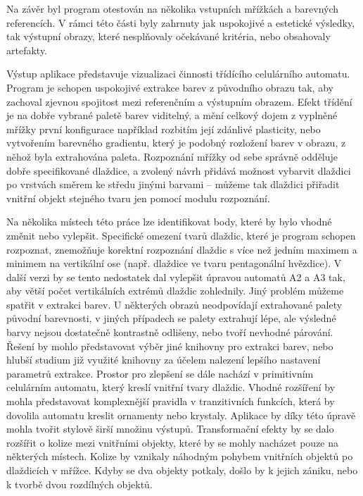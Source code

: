 Na závěr byl program otestován na několika vstupních mřížkách a barevných referencích. V rámci této části byly zahrnuty jak uspokojivé a estetické výsledky, tak výstupní obrazy, které nesplňovaly očekávané kritéria, nebo obsahovaly artefakty.

Výstup aplikace představuje vizualizaci činnosti třídícího celulárního automatu. Program je schopen uspokojivé extrakce barev z původního obrazu tak, aby zachoval zjevnou spojitost mezi referenčním a výstupním obrazem. Efekt třídění je na dobře vybrané paletě barev viditelný, a mění celkový dojem z vyplněné mřížky první konfigurace například rozbitím její zdánlivé plasticity, nebo vytvořením barevného gradientu, který je podobný rozložení barev v obrazu, z něhož byla extrahována paleta. Rozpoznání mřížky od sebe správně odděluje dobře specifikované dlaždice, a zvolený návrh přidává možnost vybarvit dlaždici po vrstvách směrem ke středu jinými barvami -- můžeme tak dlaždici přiřadit vnitřní objekt stejného tvaru jen pomocí modulu rozpoznání. 

Na několika místech této práce lze identifikovat body, které by bylo vhodné změnit nebo vylepšit. Specifické omezení tvarů dlaždic, které je program schopen rozpoznat, znemožňuje korektní rozpoznání dlaždic s více než jedním maximem a minimem na vertikální ose (např. dlaždice ve tvaru pentagonální hvězdice). V další verzi by se tento nedostatek dal vylepšit úpravou automatů A2 a A3 tak, aby větší počet vertikálních extrémů dlaždic zohlednily. Jiný problém můžeme spatřit v extrakci barev. U některých obrazů neodpovídají extrahované palety původní barevnosti, v jiných případech se palety extrahují lépe, ale výsledné barvy nejsou dostatečně kontrastně odlišeny, nebo tvoří nevhodné párování. Řešení by mohlo představovat výběr jiné knihovny pro extrakci barev, nebo hlubší studium již využité knihovny za účelem nalezení lepšího nastavení parametrů extrakce. Prostor pro zlepšení se dále nachází v primitivním celulárním automatu, který kreslí vnitřní tvary dlaždic. Vhodné rozšíření by mohla představovat komplexnější pravidla v tranzitivních funkcích, která by dovolila automatu kreslit ornamenty nebo krystaly. Aplikace by díky této úpravě mohla tvořit stylově širší množinu výstupů. Transformační efekty by se dalo rozšířit o kolize mezi vnitřními objekty, které by se mohly nacházet pouze na některých místech. Kolize by vznikaly náhodným pohybem vnitřních objektů po dlaždicích v mřížce. Kdyby se dva objekty potkaly, došlo by k jejich zániku, nebo k tvorbě dvou rozdílných objektů.

